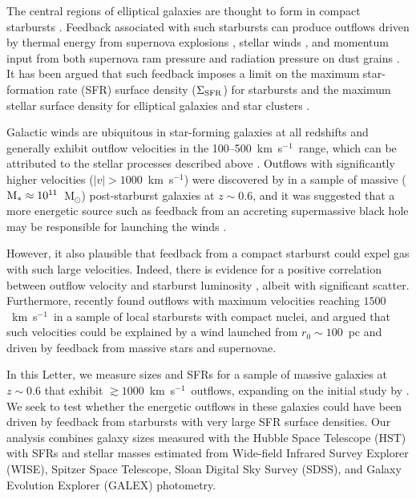 \documentclass[12pt,preprint]{aastex}
\newcommand{\kms}{km~s$^{-1}$}
\newcommand{\msun}{M$_{\odot}$}
\newcommand{\mstar}{M$_{*}$}
\newcommand{\sigmasfr}{\Sigma_{\textnormal{\scriptsize{SFR}}}}
\begin{document}
The central regions of elliptical galaxies are thought to form in
compact starbursts \citep{kor09,hop09}.  Feedback associated with such
starbursts can produce outflows driven by thermal energy from
supernova explosions \citep{che85}, stellar winds \citep{lei92}, and
momentum input from both supernova ram pressure and radiation pressure
on dust grains \citep{mur05}.  It has been argued that such feedback
imposes a limit on the maximum star-formation rate (SFR) surface
density ($\sigmasfr$) for starbursts \citep{leh96,meu97,mur05,tho05}
and the maximum stellar surface density for elliptical galaxies and
star clusters \citep{hop10}.

Galactic winds are ubiquitous in star-forming galaxies at all
redshifts and generally exhibit outflow velocities in the
100--500~\kms\ range, which can be attributed to the stellar processes
described above \citep{hec00,sha03,mar05,rup05,wei09,rub10}.  Outflows
with significantly higher velocities ($|v|>1000$~\kms) were discovered
by \citet{tre07} in a sample of massive
($\textnormal{\mstar}\approx10^{11}$~\msun) post-starburst galaxies at
$z\sim0.6$, and it was suggested that a more energetic source such as
feedback from an accreting supermassive black hole \citep{sil98,dim05}
may be responsible for launching the winds \citep[see][for a recent
  review]{fab12}.

However, it also plausible that feedback from a compact starburst
could expel gas with such large velocities.  Indeed, there is evidence
for a positive correlation between outflow velocity and starburst
luminosity \citep{mar05,rup05,tre07}, albeit with significant scatter.
Furthermore, \citet{hec11} recently found outflows with maximum
velocities reaching $1500$~\kms\ in a sample of local starbursts with
compact nuclei, and argued that such velocities could be explained by
a wind launched from $r_0\sim100$~pc and driven by feedback from
massive stars and supernovae.


In this Letter, we measure sizes and SFRs for a sample of massive
galaxies at $z\sim0.6$ that exhibit $\gtrsim1000$~\kms\ outflows,
expanding on the initial study by \citet{tre07}.  We seek to test
whether the energetic outflows in these galaxies could have been
driven by feedback from starbursts with very large SFR surface
densities.  Our analysis combines galaxy sizes measured with the
Hubble Space Telescope (HST) with SFRs and stellar masses estimated
from Wide-field Infrared Survey Explorer (WISE), Spitzer Space
Telescope, Sloan Digital Sky Survey (SDSS), and Galaxy Evolution
Explorer (GALEX) photometry.
\end{document}
